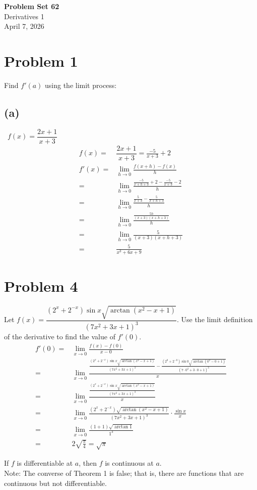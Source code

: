 \documentclass[12pt]{article}
\newcommand*{\limit}[2][x]{\ensuremath{\displaystyle\lim_{#1\to#2}}}
\newcommand{\problem}[1]{\section{Problem #1}}
\newcommand{\subproblem}[1]{\subsection{(#1)} \,}
\newcommand{\theorem}[2]{\begin{tcolorbox}[title={#1},colback=blue!5!white,colframe=blue!75!black,parbox=false] #2 \end{tcolorbox}}
\begin{document}
\vspace*{0cm}

\begin{center}
    {\Large \bfseries Problem Set 62} \\[0.5cm]
    {\large Derivatives 1} \\[0.35cm]
    {\normalsize April 7, 2026}
\end{center}


\problem{1}
Find $f'(a)$ using the limit process:
\subproblem{a} $f(x)=\dfrac{2x+1}{x+3}$
\begin{align*}
f(x)=&\dfrac{2x+1}{x+3}=\frac{-5}{x+3}+2\\
  f'(x)=&\lim_{h \to 0} \frac{f(x+h)-f(x)}{h}\\=&\lim_{h \to 0}\frac{\frac{-5}{x+h+3}+2-\frac{-5}{x+3}-2}{h}\\=&\lim_{h \to 0}\frac{\frac{5}{x+3}-\frac{5}{x+h+3}}{h}\\=&\lim_{h \to 0}\frac{\frac{5h}{(x+3)(x+h+3)}}{h}\\=&\lim_{h \to 0}\frac{5}{(x+3)(x+h+3)}\\
  =&\boxed{\frac{5}{x^3+6x+9}}
\end{align*}

\problem{4}
Let $f(x)=\dfrac{(2^x+2^{-x})\sin x\sqrt{\arctan (x^2-x+1)}}{(7x^2+3x+1)^3}$. Use the limit definition of the derivative to find the value of $f'(0)$.
\begin{align*}
    f'(0)
    =&\limit{0} \frac{f(x)-f(0)}{x-0}\\
    =&\limit{0} \frac{\frac{(2^x+2^{-x})\sin x\sqrt{\arctan (x^2-x+1)}}{(7x^2+3x+1)^3}-\frac{(2^0+2^{-0})\sin 0\sqrt{\arctan (0^2-0+1)}}{(7\cdot0^2+3\cdot0+1)^3}}{x}\\
    =&\limit{0} \frac{\frac{(2^x+2^{-x})\sin x\sqrt{\arctan (x^2-x+1)}}{(7x^2+3x+1)^3}}{x}\\
    =&\limit{0} \frac{(2^x+2^{-x})\sqrt{\arctan (x^2-x+1)}}{(7x^2+3x+1)^3} \cdot \frac{\sin x}{x}\\
    =&\limit{0} \frac{(1+1)\sqrt{\arctan1}}{1^3}\\
    =& 2\sqrt{\frac{\pi}{4}} = \boxed{\sqrt{\pi}}
\end{align*}

\theorem{Theorem 1 Differentiability implies Continuity}{If $f$ is differentiable at $a$, then $f$ is continuous at $a$.\vspace{0.5em}\\ 
Note: The converse of Theorem 1 is false; that is, there are functions that are continuous but not differentiable.}
\end{document}
